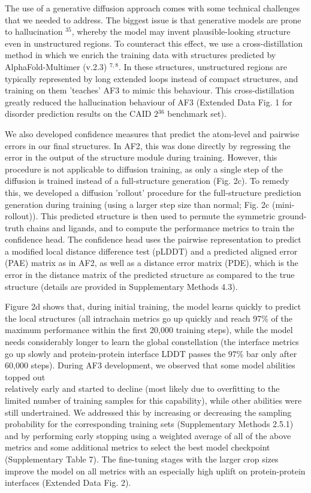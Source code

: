 \documentclass[10pt]{article}
\begin{document}
The use of a generative diffusion approach comes with some technical challenges that we needed to address. The biggest issue is that generative models are prone to hallucination ${ }^{35}$, whereby the model may invent plausible-looking structure even in unstructured regions. To counteract this effect, we use a cross-distillation method in which we enrich the training data with structures predicted by AlphaFold-Multimer (v.2.3) ${ }^{7,8}$. In these structures, unstructured regions are typically represented by long extended loops instead of compact structures, and training on them 'teaches' AF3 to mimic this behaviour. This cross-distillation greatly reduced the hallucination behaviour of AF3 (Extended Data Fig. 1 for disorder prediction results on the CAID $2{ }^{36}$ benchmark set).

We also developed confidence measures that predict the atom-level and pairwise errors in our final structures. In AF2, this was done directly by regressing the error in the output of the structure module during training. However, this procedure is not applicable to diffusion training, as only a single step of the diffusion is trained instead of a full-structure generation (Fig. 2c). To remedy this, we developed a diffusion 'rollout' procedure for the full-structure prediction generation during training (using a larger step size than normal; Fig. 2c (mini-rollout)). This predicted structure is then used to permute the symmetric ground-truth chains and ligands, and to compute the performance metrics to train the confidence head. The confidence head uses the pairwise representation to predict a modified local distance difference test (pLDDT) and a predicted aligned error (PAE) matrix as in AF2, as well as a distance error matrix (PDE), which is the error in the distance matrix of the predicted structure as compared to the true structure (details are provided in Supplementary Methods 4.3).

Figure 2d shows that, during initial training, the model learns quickly to predict the local structures (all intrachain metrics go up quickly and reach 97\% of the maximum performance within the first 20,000 training steps), while the model needs considerably longer to learn the global constellation (the interface metrics go up slowly and protein-protein interface LDDT passes the $97 \%$ bar only after 60,000 steps). During AF3 development, we observed that some model abilities topped out\\
relatively early and started to decline (most likely due to overfitting to the limited number of training samples for this capability), while other abilities were still undertrained. We addressed this by increasing or decreasing the sampling probability for the corresponding training sets (Supplementary Methods 2.5.1) and by performing early stopping using a weighted average of all of the above metrics and some additional metrics to select the best model checkpoint (Supplementary Table 7). The fine-tuning stages with the larger crop sizes improve the model on all metrics with an especially high uplift on protein-protein interfaces (Extended Data Fig. 2).
\end{document}
